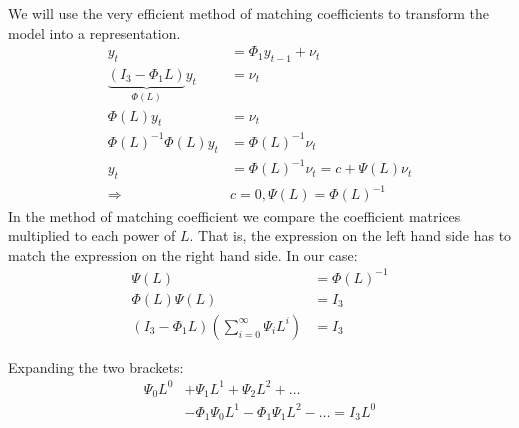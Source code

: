 \begin{enumerate}
          \begin{sol}
              We will use the very efficient method of matching coefficients to transform the \varp[1]{} model into a \vmaq[$\infty$]{} representation.
              \begin{align*}
                  y_t
                   & = \Phi_1 y_{t-1} + \nu_t
                  \\
                  \underbrace{(I_3 - \Phi_1 L)}_{\Phi(L)} y_t
                   & = \nu_t
                  \\
                  \Phi(L) y_t
                   & = \nu_t
                  \\
                  \Phi(L)^{-1} \Phi(L) y_t
                   & = \Phi(L)^{-1} \nu_t
                  \\
                  y_t
                   & = \Phi(L)^{-1} \nu_t
                  = c + \Psi(L) \nu_t
                  \\
                  \Rightarrow
                   & c = 0,
                  \Psi(L) = \Phi(L)^{-1}
              \end{align*}
              In the method of matching coefficient we compare the coefficient matrices multiplied to each power of $L$. That is, the expression on the left hand side has to match the expression on the right hand side. In our case:
              \begin{align*}
                  \Psi(L)
                   & = \Phi(L)^{-1}
                  \\
                  \Phi(L) \Psi(L)
                   & = I_3
                  \\
                  (I_3 - \Phi_1 L) \left(\sum_{i=0}^\infty \Psi_i L^i\right)
                   & = I_3
              \end{align*}

              Expanding the two brackets:
              \begin{align*}
                  \Psi_0 L^0
                   & + \Psi_1 L^1 + \Psi_2 L^2 + \dots
                  \\
                   & - \Phi_1 \Psi_0 L^1 - \Phi_1 \Psi_1 L^2 - \dots = I_3 L^0
              \end{align*}


\end{sol}
\end{enumerate}
